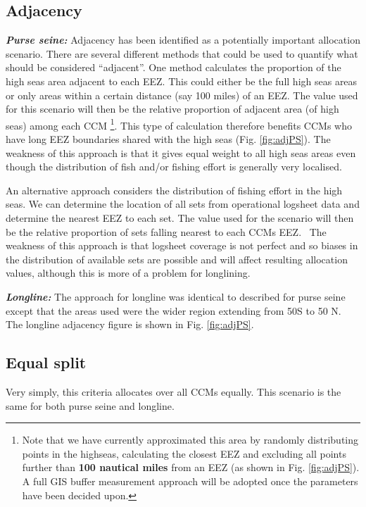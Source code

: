 \documentclass[11pt]{article}
\begin{document}
\subsection*{Adjacency}
\noindent\textbf{\emph{Purse seine:}}
Adjacency has been identified as a potentially important allocation scenario. There are several different methods that could be used to quantify what should be considered ``adjacent''. One method calculates the proportion of the high seas area adjacent to each EEZ. This could either be the full high seas areas or only areas within a certain distance (say 100 miles) of an EEZ. The value used for this scenario will then be the relative proportion of adjacent area (of high seas) among each CCM \footnote{Note that we have currently approximated this area by randomly distributing points in the highseas, calculating the closest EEZ and excluding all points further than {\bf 100 nautical miles} from an EEZ (as shown in Fig. \ref{fig:adjPS}). A full GIS buffer measurement approach will be adopted once the parameters have been decided upon.}. This type of calculation therefore benefits CCMs who have long EEZ boundaries shared with the high seas (Fig. \ref{fig:adjPS}). The weakness of this approach is that it gives equal weight to all high seas areas even though the distribution of fish and/or fishing effort is generally very localised.

An alternative approach considers the distribution of fishing effort in the high seas. We can determine the location of all sets from operational logsheet data and determine the nearest EEZ to each set. The value used for the scenario will then be the relative proportion of sets falling nearest to each CCMs EEZ.%
\ The weakness of this approach is that logsheet coverage is not perfect and so biases in the distribution of available sets are possible and will affect resulting allocation values, although this is more of a problem for longlining.

\noindent\textbf{\emph{Longline:}}
The approach for longline was identical to described for purse seine except that the areas used were the wider region extending from 50\degree S to 50 \degree N. The longline adjacency figure is shown in Fig. \ref{fig:adjPS}.%

\subsection*{Equal split}
Very simply, this criteria allocates over all CCMs equally. This scenario is the same for both purse seine and longline.
\end{document}
